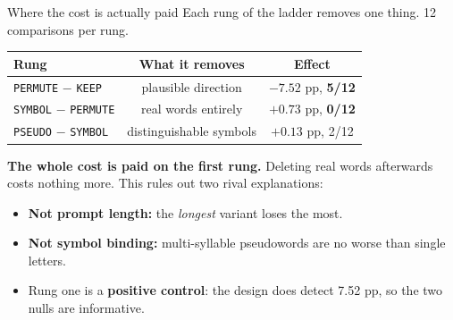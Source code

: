\documentclass{beamer}
\begin{document}
\begin{frame}{Where the cost is actually paid}
  Each rung of the ladder removes one thing.
  12 comparisons per rung.

  \begin{center}
  \small
  \begin{tabular}{lcc}
    \toprule
    Rung & What it removes & Effect \\
    \midrule
    \texttt{PERMUTE} $-$ \texttt{KEEP}   & plausible direction & $\mathbf{-7.52}$ pp, \textbf{5/12} \\
    \texttt{SYMBOL} $-$ \texttt{PERMUTE} & real words entirely & $+0.73$ pp, \textbf{0/12} \\
    \texttt{PSEUDO} $-$ \texttt{SYMBOL}  & distinguishable symbols & $+0.13$ pp, 2/12 \\
    \bottomrule
  \end{tabular}
  \end{center}

  \vspace{0.3cm}
  \textbf{The whole cost is paid on the first rung.} Deleting real words
  afterwards costs nothing more. This rules out two rival explanations:

  \begin{itemize}
    \item \textbf{Not prompt length:} the \emph{longest} variant loses the most.
    \item \textbf{Not symbol binding:} multi-syllable pseudowords are no worse
      than single letters.
    \item Rung one is a \textbf{positive control}: the design does detect
      7.52 pp, so the two nulls are informative.
  \end{itemize}
\end{frame}
\end{document}
